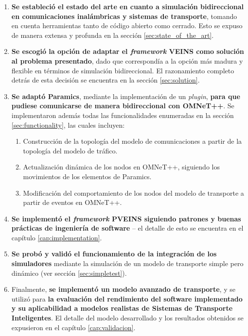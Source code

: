 \begin{enumerate}
    \item \textbf{Se estableció el estado del arte en cuanto a simulación bidireccional en comunicaciones inalámbricas y sistemas de transporte}, tomando en cuenta herramientas tanto de código abierto como cerrado. Esto se expuso de manera extensa y profunda en la sección \ref{sec:state_of_the_art}.
    
    \item \textbf{Se escogió la opción de adaptar el \emph{framework} VEINS como solución al problema presentado}, dado que correspondía a la opción más madura y flexible en términos de simulación bidireccional. El razonamiento completo detrás de esta decisión se encuentra en la sección \ref{sec:solution}.
    
    \item \textbf{Se adaptó Paramics}, mediante la implementación de un \emph{plugin}, \textbf{para que pudiese comunicarse de manera bidireccional con OMNeT++}. Se implementaron además todas las funcionalidades enumeradas en la sección \ref{sec:functionality}, las cuales incluyen:
    \begin{enumerate}
        \item Construcción de la topología del modelo de comunicaciones a partir de la topología del modelo de tráfico.
        \item Actualización dinámica de los nodos en OMNeT++, siguiendo los movimientos de los elementos de Paramics.
        \item Modificación del comportamiento de los nodos del modelo de transporte a partir de eventos en OMNeT++.
    \end{enumerate}
    \item \textbf{Se implementó el \emph{framework} PVEINS siguiendo patrones y buenas prácticas de ingeniería de software} -- el detalle de esto se encuentra en el capítulo \ref{cap:implementation}.
    
    \item \textbf{Se probó y validó el funcionamiento de la integración de los simuladores} mediante la simulación de un modelo de transporte simple pero dinámico (ver sección \ref{sec:simpletest}).
    
    \item Finalmente, \textbf{se implementó un modelo avanzado de transporte}, y se utilizó para \textbf{la evaluación del rendimiento del software implementado y su aplicabilidad a modelos realistas de Sistemas de Transporte Inteligentes}. El detalle del modelo desarrollado y los resultados obtenidos se expusieron en el capítulo \ref{cap:validacion}.
\end{enumerate}